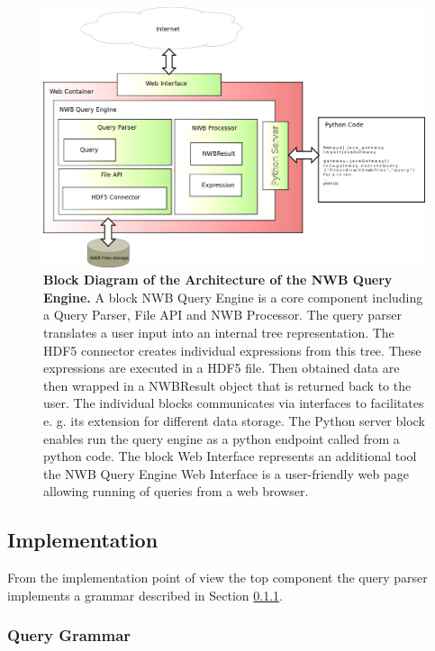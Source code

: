 \documentclass[utf8]{frontiersSCNS} %
\begin{document}
\begin{figure}
  \includegraphics[width=17cm]{architecture}
\caption{\textbf{Block Diagram of the Architecture of the NWB Query Engine. } A block NWB Query Engine is a core component including a Query Parser, File API and NWB Processor. The query parser translates a user input into an internal tree representation. The HDF5 connector creates individual expressions from this tree. These expressions are executed in a HDF5 file. Then obtained data are then wrapped in a NWBResult object that is returned back to the user. The individual blocks communicates via interfaces to facilitates e. g. its extension for different data storage. The Python server block enables run the query engine as a python endpoint called from a python code. The block Web Interface represents an additional tool the NWB Query Engine Web Interface is a user-friendly web page allowing running of queries from a web browser.}
\label{fig:architecture}
\end{figure}


\subsection{Implementation}
\label{Implementation}

From the implementation point of view the top component the query parser implements a grammar described in Section \ref{Query_Grammar}. 

\subsubsection{Query Grammar}
\label{Query_Grammar}
\end{document}

